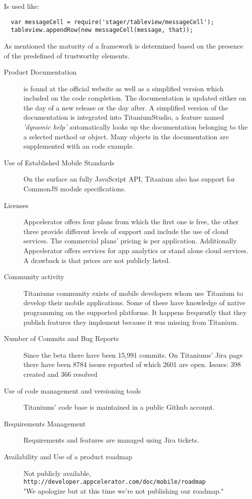 Is used like:
\begin{verbatim}
  var messageCell = require('stager/tableview/messageCell');
  tableview.appendRow(new messageCell(message, that));
\end{verbatim}

As mentioned the maturity of a framework is determined based on the presence of the predefined of trustworthy elements.

\begin{description}
\item [Product Documentation] is found at the official website as well as a simplified version which included on the code completion.
The documentation is updated either on the day of a new release or the day after.\cite{Inc2012b} A simplified version of the documentation is integrated into TitaniumStudio, a feature named \emph{'dynamic help'} automatically looks up the documentation belonging to the a selected method or object.
Many objects in the documentation are supplemented with an code example.
\item [Use of Established Mobile Standards] 
On the surface an fully JavaScript API, Titanium also has support for CommonJS module specifications. 
\item [Licenses] Appcelerator offers four plans from which the first one is free, the other three provide different levels of support and include the use of cloud services. The commercial plans' pricing is per application. Additionally Appcelerator offers services for app analytics or stand alone cloud services. A drawback is that prices are not publicly listed.
\item [Community activity] Titaniums community exists of mobile developers whom use Titanium to develop their mobile applications. Some of these have knowledge of native programming on the supported platforms. It happens frequently that they publish features they implement because it was missing from Titanium. 
\item [Number of Commits and Bug Reports] Since the beta there have been 15,991 commits. %
On Titaniums' Jira page there have been 8784 issues reported of which 2601 are open.
Issues: 398 created and 366 resolved
\item [Use of code management and versioning tools] Titaniums' code base is maintained in a public Github account.%
\item [Requirements Management] Requirements and features are managed using Jira tickets.
\item [Availability and Use of a product roadmap] Not publicly available,\\
\texttt{http://developer.appcelerator.com/doc/mobile/roadmap}\\
"We apologize but at this time we're not publishing our roadmap."
\end{description}